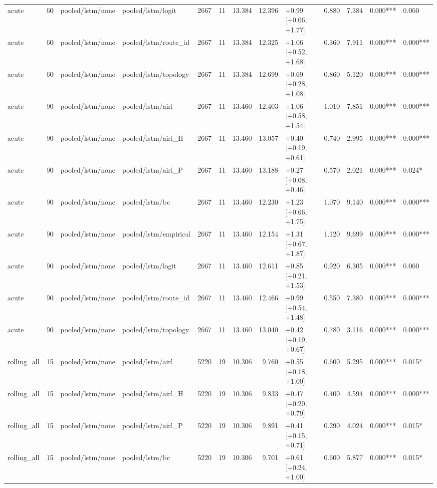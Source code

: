 \begin{tabular}{lrllrrrrlrrll}
acute & 60 & pooled/lstm/none & pooled/lstm/logit & 2667 & 11 & 13.384 & 12.396 & +0.99 [+0.06, +1.77] & 0.880 & 7.384 & 0.000*** & 0.060 \\
acute & 60 & pooled/lstm/none & pooled/lstm/route_id & 2667 & 11 & 13.384 & 12.325 & +1.06 [+0.52, +1.68] & 0.360 & 7.911 & 0.000*** & 0.000*** \\
acute & 60 & pooled/lstm/none & pooled/lstm/topology & 2667 & 11 & 13.384 & 12.699 & +0.69 [+0.28, +1.08] & 0.860 & 5.120 & 0.000*** & 0.000*** \\
acute & 90 & pooled/lstm/none & pooled/lstm/airl & 2667 & 11 & 13.460 & 12.403 & +1.06 [+0.58, +1.54] & 1.010 & 7.851 & 0.000*** & 0.000*** \\
acute & 90 & pooled/lstm/none & pooled/lstm/airl_H & 2667 & 11 & 13.460 & 13.057 & +0.40 [+0.19, +0.61] & 0.740 & 2.995 & 0.000*** & 0.000*** \\
acute & 90 & pooled/lstm/none & pooled/lstm/airl_P & 2667 & 11 & 13.460 & 13.188 & +0.27 [+0.08, +0.46] & 0.570 & 2.021 & 0.000*** & 0.024* \\
acute & 90 & pooled/lstm/none & pooled/lstm/bc & 2667 & 11 & 13.460 & 12.230 & +1.23 [+0.66, +1.75] & 1.070 & 9.140 & 0.000*** & 0.000*** \\
acute & 90 & pooled/lstm/none & pooled/lstm/empirical & 2667 & 11 & 13.460 & 12.154 & +1.31 [+0.67, +1.87] & 1.120 & 9.699 & 0.000*** & 0.000*** \\
acute & 90 & pooled/lstm/none & pooled/lstm/logit & 2667 & 11 & 13.460 & 12.611 & +0.85 [+0.21, +1.53] & 0.920 & 6.305 & 0.000*** & 0.060 \\
acute & 90 & pooled/lstm/none & pooled/lstm/route_id & 2667 & 11 & 13.460 & 12.466 & +0.99 [+0.54, +1.48] & 0.550 & 7.380 & 0.000*** & 0.000*** \\
acute & 90 & pooled/lstm/none & pooled/lstm/topology & 2667 & 11 & 13.460 & 13.040 & +0.42 [+0.19, +0.67] & 0.780 & 3.116 & 0.000*** & 0.000*** \\
rolling_all & 15 & pooled/lstm/none & pooled/lstm/airl & 5220 & 19 & 10.306 & 9.760 & +0.55 [+0.18, +1.00] & 0.600 & 5.295 & 0.000*** & 0.015* \\
rolling_all & 15 & pooled/lstm/none & pooled/lstm/airl_H & 5220 & 19 & 10.306 & 9.833 & +0.47 [+0.20, +0.79] & 0.400 & 4.594 & 0.000*** & 0.000*** \\
rolling_all & 15 & pooled/lstm/none & pooled/lstm/airl_P & 5220 & 19 & 10.306 & 9.891 & +0.41 [+0.15, +0.71] & 0.290 & 4.024 & 0.000*** & 0.015* \\
rolling_all & 15 & pooled/lstm/none & pooled/lstm/bc & 5220 & 19 & 10.306 & 9.701 & +0.61 [+0.24, +1.00] & 0.600 & 5.877 & 0.000*** & 0.015* \\

\end{tabular}
